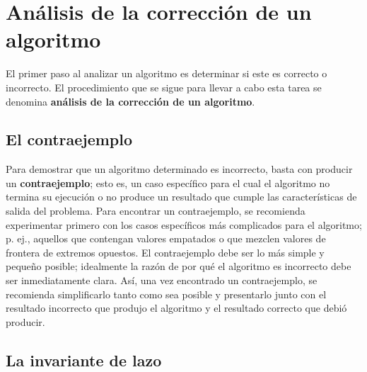 \chapter{Análisis de la corrección de un algoritmo}

El primer paso al analizar un algoritmo es determinar si este es correcto o incorrecto. 
El procedimiento que se sigue para llevar a cabo esta tarea se denomina \textbf{análisis de la corrección de un algoritmo}.

\section{El contraejemplo}




Para demostrar que un algoritmo determinado es incorrecto, basta con producir un \textbf{contraejemplo}; esto es, un caso específico para el cual el algoritmo no termina su ejecución o no produce un resultado que cumple las características de salida del problema. 
Para encontrar un contraejemplo, se recomienda experimentar primero con los casos específicos más complicados para el algoritmo; p. ej., aquellos que contengan valores empatados o que mezclen valores de frontera de extremos opuestos. 
El contraejemplo debe ser lo más simple y pequeño posible; idealmente la razón de por qué el algoritmo es incorrecto debe ser inmediatamente clara. 
Así, una vez encontrado un contraejemplo, se recomienda simplificarlo tanto como sea posible y presentarlo junto con el resultado incorrecto que produjo el algoritmo y el resultado correcto que debió producir.

\section{La invariante de lazo}



